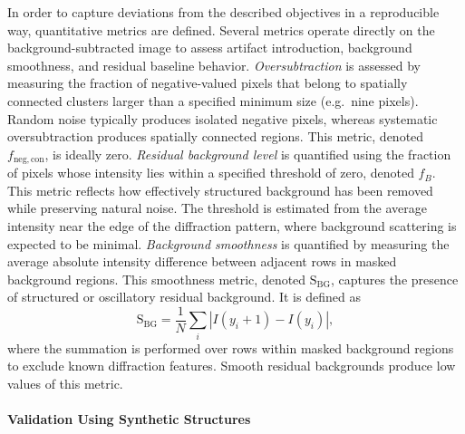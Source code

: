 \documentclass[iucr]{iucrjournals}
\begin{document}
In order to capture deviations from the described objectives in a reproducible way, quantitative metrics are defined. Several metrics operate directly on the background-subtracted image to assess artifact introduction, background smoothness, and residual baseline behavior. \textit{Oversubtraction} is assessed by measuring the fraction of negative-valued pixels that belong to spatially connected clusters larger than a specified minimum size (e.g.\ nine pixels). Random noise typically produces isolated negative pixels, whereas systematic oversubtraction produces spatially connected regions. This metric, denoted $f_{\mathrm{neg,con}}$, is ideally zero. \textit{Residual background level} is quantified using the fraction of pixels whose intensity lies within a specified threshold of zero, denoted $f_{B}$. This metric reflects how effectively structured background has been removed while preserving natural noise. The threshold is estimated from the average intensity near the edge of the diffraction pattern, where background scattering is expected to be minimal. \textit{Background smoothness} is quantified by measuring the average absolute intensity difference between adjacent rows in masked background regions. This smoothness metric, denoted $\mathrm{S}_{\mathrm{BG}}$, captures the presence of structured or oscillatory residual background. It is defined as
\begin{equation}
\mathrm{S}_{\mathrm{BG}} =
\frac{1}{N} \sum_i \left| I(y_i + 1) - I(y_i) \right|,
\end{equation}
where the summation is performed over rows within masked background regions to exclude known diffraction features. Smooth residual backgrounds produce low values of this metric.

\paragraph{Validation Using Synthetic Structures}
\end{document}
